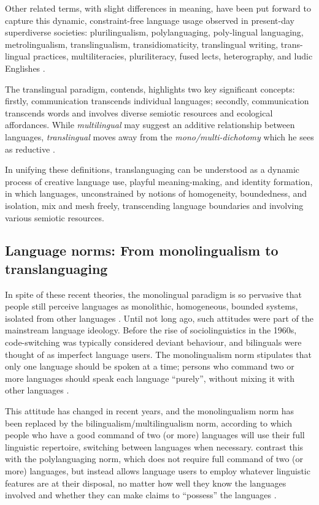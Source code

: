 \documentclass[output=paper]{langscibook}
\begin{document}
Other related terms, with slight differences in meaning, have been put forward to capture this dynamic, constraint-free language usage observed in present-day superdiverse societies: plurilingualism, polylanguaging, poly-lingual languaging, metrolingualism, translingualism, transidiomaticity, translingual writing, trans-lingual practices, multiliteracies, pluriliteracy, fused lects, heterography, and ludic Englishes \citep[9]{Canagarajah.2013}. 

The translingual paradigm, \citet[6]{Canagarajah.2013} contends, highlights two key significant concepts: firstly, communication transcends individual languages; secondly, communication transcends words and involves diverse semiotic resources and ecological affordances. While \textit{multilingual} may suggest an additive relationship between languages, \textit{translingual} moves away from the \textit{mono/multi-dichot\-o\-my} which he sees as reductive \citep[7]{Canagarajah.2013}.
 
In unifying these definitions, translanguaging can be understood as a dynamic process of creative language use, playful meaning-making, and identity formation, in which languages, unconstrained by notions of homogeneity, boundedness, and isolation, mix and mesh freely, transcending language boundaries and involving various semiotic resources.

\subsection{Language norms: From monolingualism to translanguaging}
In spite of these recent theories, the monolingual paradigm is so pervasive that people still perceive languages as monolithic, homogeneous, bounded systems, isolated from other languages \citep{Jrgensen.2011}. Until not long ago, such attitudes were part of the mainstream language ideology. Before the rise of sociolinguistics in the 1960s, code-switching was typically considered deviant behaviour, and bilinguals were thought of as imperfect language users. The monolingualism norm stipulates that only one language should be spoken at a time; persons who command two or more languages should speak each language ``purely'', without mixing it with other languages \citep[33]{Jrgensen.2011}.

This attitude has changed in recent years, and the monolingualism norm has been replaced by the bilingualism/multilingualism norm, according to which people who have a good command of two (or more) languages will use their full linguistic repertoire, switching between languages when necessary. \citet{Jrgensen.2011} contrast this with the polylanguaging norm, which does not require full command of two (or more) languages, but instead allows language users to employ whatever linguistic features are at their disposal, no matter how well they know the languages involved and whether they can make claims to ``possess'' the languages \citep[34]{Jrgensen.2011}.
\end{document}
